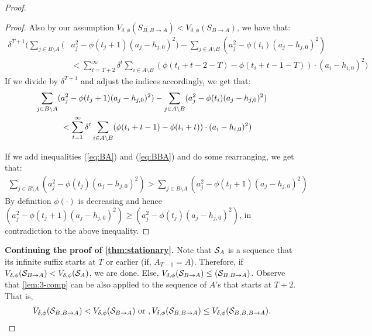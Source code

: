 \begin{proof}
\begin{proof}
	Also by our assumption $V_{\delta,\phi}(S_{B,B\rightarrow A}) < V_{\delta,\phi}(S_{B \rightarrow A})$, we have that:
	\begin{align*} \label{eq:BBA}
		\delta^{T+1} ( \sum_{j \in B\setminus A}(&a_j^2 - \phi(t_j+1)(a_j-h_{j,0})^2)-\sum_{j \in A\setminus B}(a_j^2 - \phi(t_i)(a_j-h_{j,0})^2) \\
		&< \sum_{t=T+2}^\infty \delta^t\sum_{i \in A \setminus B} (\phi(t_i+t-2-T)-\phi(t_i+t-1-T))\cdot(a_i-h_{i,0})^2)
	\end{align*}
	If we divide by $\delta^{T+1}$ and adjust the indices accordingly, we get that:
	\begin{align}
		\sum_{j \in B\setminus A}(&a_j^2 - \phi(t_j+1)(a_j-h_{j,0})^2)-\sum_{j \in A\setminus B}(a_j^2 - \phi(t_i)(a_j-h_{j,0})^2)  \\ &<
		\sum_{t=1}^\infty \delta^{t}\sum_{i \in A \setminus B} (\phi(t_i+t-1)-\phi(t_i+t))\cdot(a_i-h_{i,0})^2)  \notag
	\end{align}
    



	If we add inequalities (\ref{eq:BA}) and (\ref{eq:BBA}) and do some rearranging, we get that:
	\begin{align*}
		\sum_{j \in B\setminus A}(a_j^2 - \phi(t_j)(a_j-h_{j,0})^2) > \sum_{j \in B\setminus A}(a_j^2 - \phi(t_j+1)(a_j-h_{j,0})^2)
	\end{align*}
	By definition $\phi(\cdot)$ is decreasing and hence $(a_j^2 - \phi(t_j+1)(a_j-h_{j,0})^2) \geq (a_j^2 - \phi(t_j)(a_j-h_{j,0})^2)$, in contradiction to the above inequality.
    \end{proof}


    
\textbf{Continuing the proof of \cref{thm:stationary}.} Note that $\mathcal{S}_A$ is a sequence that its infinite suffix starts at $T$ or earlier (if, $A_{T-1} = A$). Therefore, if $V_{\delta,\phi}(\mathcal{S}_{B \rightarrow A}) < V_{\delta,\phi}(\mathcal{S}_A)$, we are done. Else, $V_{\delta,\phi}(\mathcal{S}_{B \rightarrow A}) \leq (\mathcal{S}_{B,B\rightarrow A})$. Observe that \cref{lem:3-comp} can be also applied to the sequence of $A$'s that starts at $T+2$. That is, 
\begin{align*}
     V_{\delta,\phi}(\mathcal{S}_{B,B \rightarrow A}) < V_{\delta,\phi}(\mathcal{S}_{B \rightarrow A}) \text{~or~}, V_{\delta,\phi}(\mathcal{S}_{B,B \rightarrow A}) \leq V_{\delta,\phi}(\mathcal{S}_{B,B,B\rightarrow A}). 
\end{align*}



\end{proof}
